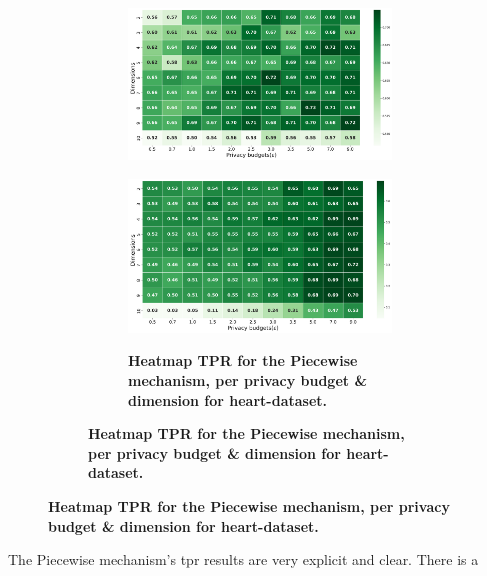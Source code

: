 {\begin{figure}[H]
\begin{subfigure}[b]{0.75\textwidth}
\begin{subfigure}[c]{1\textwidth}
            \includegraphics[width=1\textwidth]{Results/kd-laplace/kd-Laplace/heart-dataset/tpr.png}
            \label{fig:privacy_tpr_heart-dataset_adversial_advantage_kd-laplace}
        \end{subfigure}
        \vfill %

        \begin{subfigure}[c]{1\textwidth}
            \caption{\textbf{Heatmap TPR for the Piecewise mechanism, per privacy budget \& dimension for heart-dataset.}}
            \includegraphics[width=1\textwidth]{Results/kd-laplace/piecewise/heart-dataset/tpr.png}
            \label{fig:privacy_tpr_heart-dataset_adversial_advantage_piecewise}
        \end{subfigure}
    \end{subfigure}
\end{figure}
The Piecewise mechanism's \gls{tpr} results are very explicit and clear. 
There is a 
\newpage

}
